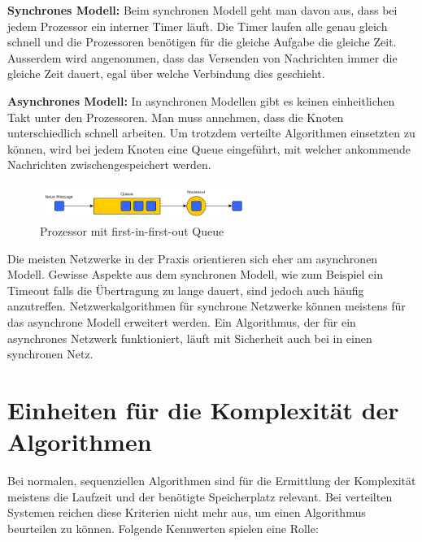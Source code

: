 \textbf{Synchrones Modell:}
Beim synchronen Modell geht man davon aus, dass bei jedem Prozessor ein interner Timer läuft. Die Timer laufen alle genau gleich schnell und die Prozessoren benötigen für die gleiche Aufgabe die gleiche Zeit. Ausserdem wird angenommen, dass das Versenden von Nachrichten immer die gleiche Zeit dauert, egal über welche Verbindung dies geschieht.

\textbf{Asynchrones Modell:}
In asynchronen Modellen gibt es keinen einheitlichen Takt unter den Prozessoren. Man muss annehmen, dass die Knoten unterschiedlich schnell arbeiten. Um trotzdem verteilte Algorithmen einsetzten zu können, wird bei jedem Knoten eine Queue eingeführt, mit welcher ankommende Nachrichten zwischengespeichert werden.

\begin{figure}[H]
	\centering
		\includegraphics[width=0.6\textwidth]{bilder/queue.png}
	\caption{\label{fig:network}Prozessor mit first-in-first-out Queue}
\end{figure}


Die meisten Netzwerke in der Praxis orientieren sich eher am asynchronen Modell. Gewisse Aspekte aus dem synchronen Modell, wie zum Beispiel ein Timeout falls die Übertragung zu lange dauert, sind jedoch auch häufig anzutreffen. Netzwerkalgorithmen für synchrone Netzwerke können meistens für das asynchrone Modell erweitert werden. Ein Algorithmus, der für ein asynchrones Netzwerk funktioniert, läuft mit Sicherheit auch bei in einen synchronen Netz.


\section{Einheiten für die Komplexität der Algorithmen}
Bei normalen, sequenziellen Algorithmen sind für die Ermittlung der Komplexität meistens die Laufzeit und der benötigte Speicherplatz relevant. Bei verteilten Systemen reichen diese Kriterien nicht mehr aus, um einen Algorithmus beurteilen zu können.
Folgende Kennwerten spielen eine Rolle:

